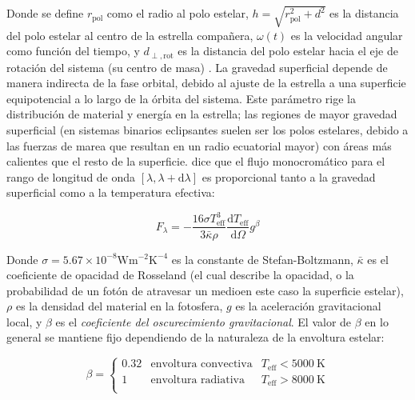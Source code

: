 Donde se define $r_{\mathrm{pol}}$ como el radio al polo estelar, $h =
\sqrt{r_{\mathrm{pol}}^2 + d^2}$ es la distancia del polo estelar al centro de
la estrella compañera, $\omega(t)$ es la velocidad angular como función del
tiempo, y $d_{\perp,\textrm{rot}}$ es la distancia del polo estelar hacia el eje
de rotación del sistema (su centro de masa)
. La gravedad superficial
depende de manera indirecta de la fase orbital, debido al ajuste de la estrella
a una superficie equipotencial a lo largo de la órbita del sistema. Este
parámetro rige la distribución de material y energía en la estrella; las
regiones de mayor gravedad superficial (en sistemas binarios eclipsantes suelen
ser los polos estelares, debido a las fuerzas de marea que resultan en un radio
ecuatorial mayor) con áreas más calientes que el resto de la superficie.
 dice que el flujo
monocromático para el rango de longitud de onda $[\lambda, \lambda +
\mathrm{d}\lambda]$ es proporcional tanto a la gravedad superficial como a la
temperatura efectiva:

\begin{eqfloat}[!ht]
	\centering
	\begin{equation}
		F_{\lambda} = - \frac{16 \sigma T_{\textrm{eff}}^3}{3 \bar{\kappa} \rho} \frac{\textrm{d}T_{\textrm{eff}}}{\textrm{d}\Omega} g^{\beta}
	\end{equation}
\end{eqfloat}

Donde $\sigma = 5.67 \times 10^{-8} \mathrm{W} \mathrm{m}^{-2} \mathrm{K}^{-4}$
es la constante de Stefan-Boltzmann, $\bar{\kappa}$ es el coeficiente de
opacidad de Rosseland (el cual describe la opacidad, o la probabilidad de un
fotón de atravesar un medio\textemdash en este caso la superficie estelar),
$\rho$ es la densidad del material en la fotosfera, $g$ es la aceleración
gravitacional local, y $\beta$ es el \textit{coeficiente del oscurecimiento
gravitacional}. El valor de $\beta$ en lo general se mantiene fijo dependiendo
de la naturaleza de la envoltura estelar:

\begin{eqfloat}[!ht]
	\centering
	\begin{equation}
		\beta = \left\{\begin{matrix}
			0.32 & \textrm{envoltura convectiva} & T_{\textrm{eff}} < 5000 \ \textrm{K} \\
			1 & \textrm{envoltura radiativa} & T_{\textrm{eff}} > 8000 \ \textrm{K} \\
			\end{matrix}\right. 
	\end{equation}
\end{eqfloat}

